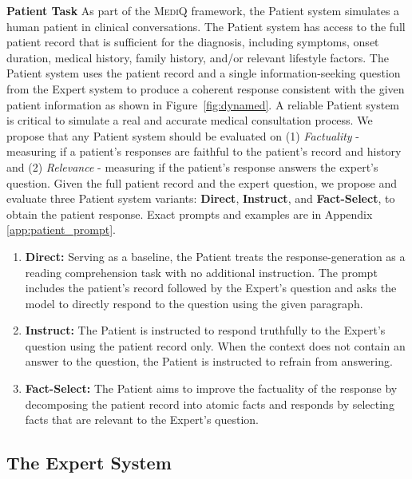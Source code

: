 \documentclass{article}
\newcommand{\Fref}[1]{Figure~\ref{#1}}
\begin{document}
\textbf{Patient Task}\hspace{3mm}
As part of the \textsc{MediQ} framework, the Patient system simulates a  human patient in clinical conversations. 
The Patient system has access to the full patient record that is sufficient for the diagnosis, including symptoms, onset duration, medical history, family history, and/or relevant lifestyle factors. The Patient system uses the patient record and a single information-seeking question from the Expert system to produce a coherent response consistent with the given patient information as shown in  \Fref{fig:dynamed}.
A reliable Patient system is critical to simulate a real and accurate medical consultation process. We propose that any Patient system should be evaluated on (1) \emph{Factuality} - measuring if a patient's responses are faithful to the patient's record and history and (2) \emph{Relevance} - measuring if the patient's response answers the expert's question. 
Given the full patient record and the expert question, we propose and evaluate three Patient system variants: \textbf{Direct}, \textbf{Instruct}, and \textbf{Fact-Select}, to obtain the patient response. Exact prompts and examples are in Appendix \ref{app:patient_prompt}.

\vspace{-0.5mm}
\begin{enumerate}
[noitemsep,topsep=0pt,leftmargin=12pt]
\item[\textbf{1.}] \textbf{Direct:} Serving as a baseline, the Patient treats the response-generation as a reading comprehension task with no additional instruction. The prompt includes the patient's record followed by the Expert's question and asks the model to directly respond to the question using the given paragraph.%
\item[\textbf{2.}] \textbf{Instruct:} The Patient is instructed to respond truthfully to the Expert's question using the patient record only. When the context does not contain an answer to the question, the Patient is instructed to refrain from answering.
\item[\textbf{3.}] \textbf{Fact-Select:} 
The Patient aims to improve the factuality of the response by decomposing the patient record into atomic facts and responds by selecting facts that are relevant to the Expert's question.
\end{enumerate}

\vspace{-0.5mm}
\subsection{The Expert System}\label{sec:framework:expert}\vspace{-0.5mm}
\end{document}
